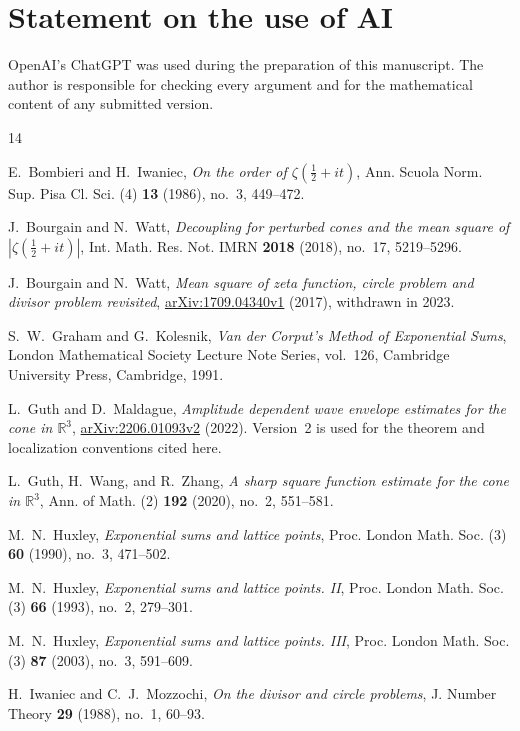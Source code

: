 \documentclass[11pt,reqno]{amsart}
\numberwithin{equation}{section}
\theoremstyle{definition}
\theoremstyle{remark}
\newcommand{\R}{\mathbb R}
\begin{document}
\section*{Statement on the use of AI}
OpenAI's ChatGPT was used during the preparation of this manuscript.
The author is responsible for checking every argument and for the
mathematical content of any submitted version.

\begin{thebibliography}{14}

E.~Bombieri and H.~Iwaniec,
\emph{On the order of $\zeta(\frac12+it)$},
Ann. Scuola Norm. Sup. Pisa Cl. Sci. (4) \textbf{13} (1986), no.~3, 449--472.

J.~Bourgain and N.~Watt,
\emph{Decoupling for perturbed cones and the mean square of $|\zeta(\frac12+it)|$},
Int. Math. Res. Not. IMRN \textbf{2018} (2018), no.~17, 5219--5296.

J.~Bourgain and N.~Watt,
\emph{Mean square of zeta function, circle problem and divisor problem revisited},
\href{https://arxiv.org/abs/1709.04340v1}{arXiv:1709.04340v1} (2017), withdrawn in 2023.

S.~W.~Graham and G.~Kolesnik,
\emph{Van der Corput's Method of Exponential Sums},
London Mathematical Society Lecture Note Series, vol.~126,
Cambridge University Press, Cambridge, 1991.

L.~Guth and D.~Maldague,
\emph{Amplitude dependent wave envelope estimates for the cone in $\R^3$},
\href{https://arxiv.org/abs/2206.01093v2}{arXiv:2206.01093v2} (2022).
Version~2 is used for the theorem and localization conventions cited here.

L.~Guth, H.~Wang, and R.~Zhang,
\emph{A sharp square function estimate for the cone in $\R^3$},
Ann. of Math. (2) \textbf{192} (2020), no.~2, 551--581.

M.~N.~Huxley,
\emph{Exponential sums and lattice points},
Proc. London Math. Soc. (3) \textbf{60} (1990), no.~3, 471--502.

M.~N.~Huxley,
\emph{Exponential sums and lattice points. II},
Proc. London Math. Soc. (3) \textbf{66} (1993), no.~2, 279--301.

M.~N.~Huxley,
\emph{Exponential sums and lattice points. III},
Proc. London Math. Soc. (3) \textbf{87} (2003), no.~3, 591--609.

H.~Iwaniec and C.~J.~Mozzochi,
\emph{On the divisor and circle problems},
J. Number Theory \textbf{29} (1988), no.~1, 60--93.


\end{thebibliography}
\end{document}
